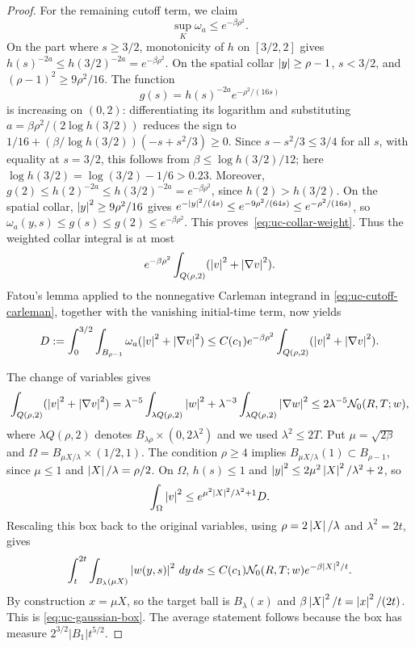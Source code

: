 \documentclass[11pt,letterpaper]{article}
\numberwithin{equation}{section}
\theoremstyle{plain}
\theoremstyle{definition}
\theoremstyle{remark}
\begin{document}
\begin{proof}
For the remaining cutoff term, we claim
\begin{equation}\label{eq:uc-collar-weight}
 \sup_K\omega_a\leq e^{-\beta\rho^2}.
\end{equation}
On the part where $s\geq3/2$, monotonicity of $h$ on $[3/2,2]$ gives
$h(s)^{-2a}\leq h(3/2)^{-2a}=e^{-\beta\rho^2}$. On the spatial collar
$\left\lvert y\right\rvert\geq\rho-1$, $s<3/2$, and
$(\rho-1)^2\geq9\rho^2/16$. The function
\[
 g(s)=h(s)^{-2a}e^{-\rho^2/(16s)}
\]
is increasing on $(0,2)$: differentiating its logarithm and substituting
$a=\beta\rho^2/(2\log h(3/2))$ reduces the sign to
$1/16+(\beta/\log h(3/2))(-s+s^2/3)\geq0$. Since $s-s^2/3\leq3/4$ for
all $s$, with equality at $s=3/2$, this follows from
$\beta\leq\log h(3/2)/12$; here $\log h(3/2)=\log(3/2)-1/6>0.23$. Moreover,
$g(2)\leq h(2)^{-2a}\leq h(3/2)^{-2a}=e^{-\beta\rho^2}$, since $h(2)>h(3/2)$.
On the spatial collar, $\left\lvert y\right\rvert^2\geq9\rho^2/16$ gives
$e^{-\left\lvert y\right\rvert^2/(4s)}\leq e^{-9\rho^2/(64s)}\leq e^{-\rho^2/(16s)}$, so
$\omega_a(y,s)\leq g(s)\leq g(2)\leq e^{-\beta\rho^2}$. This
proves~\eqref{eq:uc-collar-weight}. Thus the weighted collar integral is at
most
\[
 e^{-\beta\rho^2}\int_{Q(\rho,2)}(\left\lvert v\right\rvert^2+\left\lvert \nabla v\right\rvert^2).
\]
Fatou's lemma applied to the nonnegative Carleman integrand in
\eqref{eq:uc-cutoff-carleman}, together with the vanishing initial-time term,
now yields
\begin{equation}\label{eq:uc-interior-weight}
 D:=\int_0^{3/2}\int_{B_{\rho-1}}\omega_a
                  (\left\lvert v\right\rvert^2+\left\lvert \nabla v\right\rvert^2)
 \leq C(c_1)e^{-\beta\rho^2}
       \int_{Q(\rho,2)}(\left\lvert v\right\rvert^2+\left\lvert \nabla v\right\rvert^2).
\end{equation}

The change of variables gives
\[
 \int_{Q(\rho,2)}(\left\lvert v\right\rvert^2+\left\lvert \nabla v\right\rvert^2)
 =\lambda^{-5}\int_{\lambda Q(\rho,2)}\left\lvert w\right\rvert^2
  +\lambda^{-3}\int_{\lambda Q(\rho,2)}\left\lvert \nabla w\right\rvert^2
 \leq 2\lambda^{-5}\mathcal N_0(R,T;w),
\]
where $\lambda Q(\rho,2)$ denotes
$B_{\lambda\rho}\times(0,2\lambda^2)$ and we used
$\lambda^2\leq2T$. Put $\mu=\sqrt{2\beta}$ and
$\Omega=B_{\mu X/\lambda}\times(1/2,1)$. The condition $\rho\geq4$
implies $B_{\mu X/\lambda}(1)\subset B_{\rho-1}$, since
$\mu\leq1$ and $\left\lvert X\right\rvert/\lambda=\rho/2$. On $\Omega$,
$h(s)\leq1$ and
$\left\lvert y\right\rvert^2\leq2\mu^2\left\lvert X\right\rvert^2/\lambda^2+2$, so
\[
 \int_\Omega\left\lvert v\right\rvert^2\leq
 e^{\mu^2\left\lvert X\right\rvert^2/\lambda^2+1}D.
\]
Rescaling this box back to the original variables, using
$\rho=2\left\lvert X\right\rvert/\lambda$ and $\lambda^2=2t$, gives
\[
 \int_t^{2t}\int_{B_\lambda(\mu X)}\left\lvert w(y,s)\right\rvert^2\,dy\,ds
 \leq C(c_1)\mathcal N_0(R,T;w)
      e^{-\beta\left\lvert X\right\rvert^2/t}.
\]
By construction $x=\mu X$, so the target ball is $B_\lambda(x)$ and
$\beta\left\lvert X\right\rvert^2/t=\left\lvert x\right\rvert^2/(2t)$. This is
\eqref{eq:uc-gaussian-box}. The average statement follows because the box
has measure $2^{3/2}|B_1|t^{5/2}$.
\end{proof}
\end{document}
